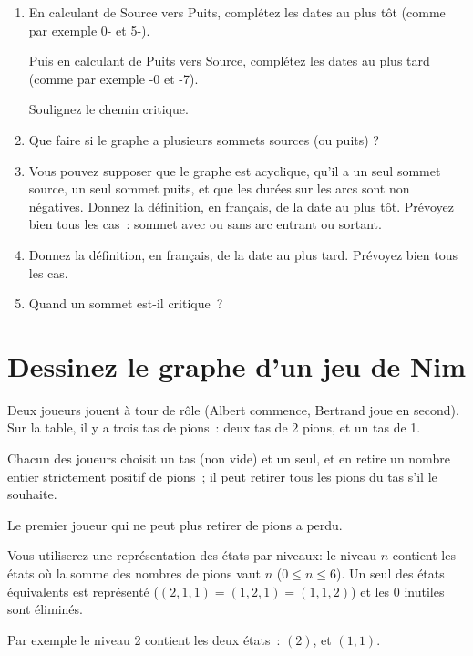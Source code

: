 \documentclass[11pt]{article}
\begin{document}
\begin{enumerate}

\item 
En calculant de Source vers Puits, complétez les dates au plus tôt (comme par exemple 0- et 5-).


Puis en calculant de  Puits vers Source, complétez les dates au plus tard (comme par exemple -0 et -7).

Soulignez le chemin critique.


\item Que faire si le graphe a plusieurs sommets sources (ou puits) ?

\item  Vous pouvez supposer que le graphe est acyclique, qu'il a un seul sommet source, un seul sommet puits, et que les durées sur les arcs sont non négatives.
Donnez la définition, en français, de la date au plus tôt. 
Prévoyez bien tous les cas~: sommet avec ou sans arc entrant ou sortant. 

\item   Donnez la définition, en français, de la date au plus tard.
Prévoyez bien tous les cas.

\item   Quand un sommet est-il critique~?

\end{enumerate}

\section{Dessinez le graphe d'un jeu de Nim}
Deux joueurs jouent à tour de rôle (Albert commence, Bertrand joue en second). Sur la table, il y a trois tas de pions~:
deux tas de 2 pions, et un tas de 1.

\smallskip
Chacun des joueurs choisit un tas (non vide) et  un seul,
et en retire un nombre entier strictement positif de pions~; il peut retirer  tous les pions du tas s'il le souhaite. 

\smallskip
Le premier joueur qui ne peut plus retirer de pions
a perdu.

\medskip
Vous utiliserez une représentation des états par niveaux: le niveau $n$ contient les états où la somme des nombres de pions vaut $n$ ($0 \le n \le 6 $). Un seul des états équivalents est représenté ($(2, 1, 1)=(1, 2, 1)=(1, 1, 2)$) et les $0$ inutiles sont éliminés.

Par exemple le niveau 2 contient
les deux  états~: $(2)$,  et $(1, 1)$. 
\end{document}
